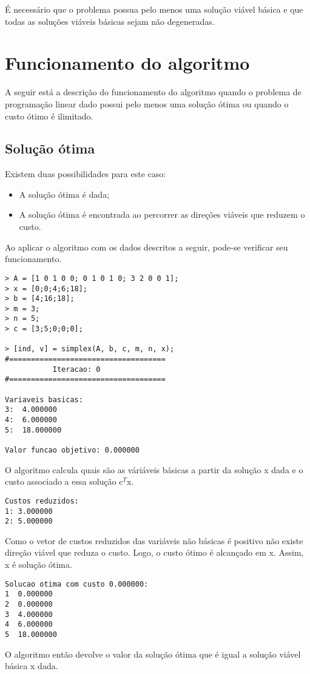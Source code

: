 \documentclass[
	12pt,				%
	openright,			%
	oneside,			%
	a4paper,			%
	english,			%
	french,				%
	spanish,			%
	brazil,				%
	]{abntex2}
\begin{document}
É necessário que o problema possua pelo menos uma solução viável básica e que todas as soluções viáveis básicas sejam não degeneradas.

\chapter{Funcionamento do algoritmo}

A seguir está a descrição do funcionamento do algoritmo quando o problema de
programação linear dado possui pelo menos uma solução ótima ou quando o custo 
ótimo é ilimitado.

\section{Solução ótima}

Existem duas possibilidades para este caso: 
\begin{itemize}
\item A solução ótima é dada;
\item A solução ótima é encontrada ao percorrer as direções viáveis que reduzem o custo.
\end{itemize}


Ao aplicar o algoritmo com os dados descritos a seguir, pode-se verificar seu funcionamento.
\begin{verbatim}
> A = [1 0 1 0 0; 0 1 0 1 0; 3 2 0 0 1];
> x = [0;0;4;6;18];
> b = [4;16;18];
> m = 3;
> n = 5;
> c = [3;5;0;0;0];

> [ind, v] = simplex(A, b, c, m, n, x);
#====================================
           Iteracao: 0
#====================================

Variaveis basicas:
3:  4.000000
4:  6.000000
5:  18.000000

Valor funcao objetivo: 0.000000
\end{verbatim}

O algoritmo calcula quais são as váriáveis básicas a partir da solução x dada e o custo associado a essa solução c$^T$x.

\begin{verbatim}
Custos reduzidos:
1: 3.000000
2: 5.000000
\end{verbatim}

Como o vetor de custos reduzidos das variáveis não básicas é positivo não existe direção viável que reduza o custo. Logo, o custo ótimo é alcançado em x. Assim, x é solução ótima.

\begin{verbatim}
Solucao otima com custo 0.000000:
1  0.000000
2  0.000000
3  4.000000
4  6.000000
5  18.000000
\end{verbatim}
O algoritmo então devolve o valor da solução ótima que é igual a solução viável básica x dada.
\end{document}
